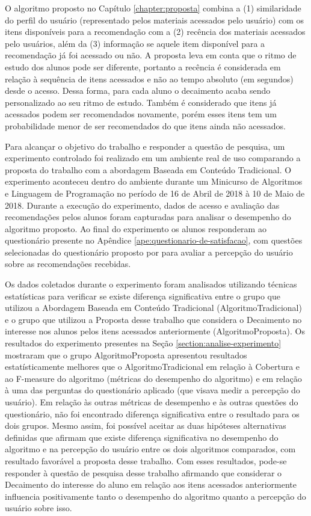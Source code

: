 O algoritmo proposto no Capítulo \ref{chapter:proposta} combina a (1) similaridade do perfil do usuário (representado
pelos materiais acessados pelo usuário) com os itens disponíveis para a recomendação com a (2) recência dos materiais
acessados pelo usuários, além da (3) informação se aquele item disponível para a recomendação já foi acessado ou não. A
proposta leva em conta que o ritmo de estudo dos alunos pode ser diferente, portanto a recência é considerada em relação
à sequência de itens acessados e não ao tempo absoluto (em segundos) desde o acesso. Dessa forma, para cada aluno o
decaimento acaba sendo personalizado ao seu ritmo de estudo. Também é considerado que itens já acessados podem ser
recomendados novamente, porém esses itens tem um probabilidade menor de ser recomendados do que itens ainda não acessados.

Para alcançar o objetivo do trabalho e responder a questão de pesquisa, um experimento controlado foi realizado em um ambiente
real de uso comparando a proposta do trabalho com a abordagem Baseada em Conteúdo Tradicional. O experimento aconteceu
dentro do ambiente \adaptwebspace durante um Minicurso de Algoritmos e Linguagem de Programação no período de 16 de Abril de
2018 à 10 de Maio de 2018. Durante a execução do experimento, dados de acesso e avaliação das recomendações pelos alunos
foram capturadas para analisar o desempenho do algoritmo proposto. Ao final do experimento os alunos responderam ao questionário presente no Apêndice
\ref{ape:questionario-de-satisfacao}, com questões selecionadas do questionário proposto por  para
avaliar a percepção do usuário sobre as recomendações recebidas.

Os dados coletados durante o experimento foram analisados utilizando técnicas estatísticas para verificar se existe
diferença significativa entre o grupo que utilizou a Abordagem Baseada em Conteúdo Tradicional (AlgoritmoTradicional)
e o grupo que utilizou a Proposta desse trabalho que considera o Decaimento no interesse nos alunos pelos itens acessados
anteriormente (AlgoritmoProposta). Os resultados do experimento presentes na Seção \ref{section:analise-experimento}
mostraram que o grupo AlgoritmoProposta apresentou resultados estatísticamente melhores que o AlgoritmoTradicional em
relação à Cobertura e ao F-measure do algoritmo (métricas do desempenho do algoritmo) e em relação à uma das perguntas
do questionário aplicado (que visava medir a percepção do usuário). Em relação às outras métricas de desempenho e às
outras questões do questionário, não foi encontrado diferença significativa entre o resultado para os dois grupos.
Mesmo assim, foi possível aceitar as duas hipóteses alternativas definidas que afirmam que existe diferença significativa
no desempenho do algoritmo e na percepção do usuário entre os dois algoritmos comparados, com resultado favorável
a proposta desse trabalho. Com esses resultados, pode-se responder à questão de pesquisa desse trabalho afirmando que
considerar o Decaimento do interesse do aluno em relação aos itens acessados anteriormente influencia positivamente
tanto o desempenho do algoritmo quanto a percepção do usuário sobre isso.

